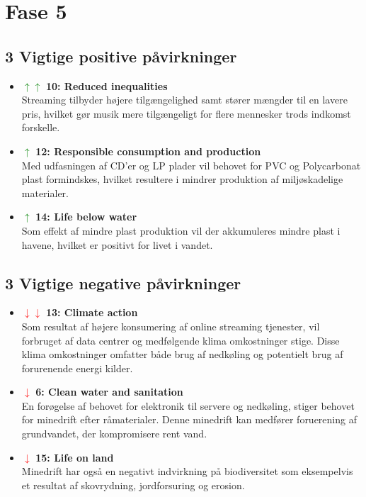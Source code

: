 \section*{Fase 5}

\subsection*{3 Vigtige positive påvirkninger}
\begin{itemize}
    \item \textcolor{green}{$\uparrow \uparrow$} \textbf{10: Reduced inequalities}\\
    Streaming tilbyder højere tilgængelighed samt stører mængder til en lavere pris, hvilket gør musik mere tilgængeligt for flere mennesker trods indkomst forskelle.

    \item \textcolor{green}{$\uparrow $} \textbf{12: Responsible consumption and production}\\
    Med udfasningen af CD'er og LP plader vil behovet for PVC og Polycarbonat plast formindskes, hvilket resultere i mindrer produktion af miljøskadelige materialer.
    
    \item \textcolor{green}{$\uparrow $} \textbf{14: Life below water}\\
    Som effekt af mindre plast produktion vil der akkumuleres mindre plast i havene, hvilket er positivt for livet i vandet.

\end{itemize}

\subsection*{3 Vigtige negative påvirkninger}
\begin{itemize}
    \item \textcolor{red}{$\downarrow \downarrow $} \textbf{13: Climate action}\\
    Som resultat af højere konsumering af online streaming tjenester, vil forbruget af data centrer og medfølgende klima omkostninger stige.
    Disse klima omkostninger omfatter både brug af nedkøling og potentielt brug af forurenende energi kilder.

    \item \textcolor{red}{$\downarrow $} \textbf{6: Clean water and sanitation}\\
    En forøgelse af behovet for elektronik til servere og nedkøling, stiger behovet for minedrift efter råmaterialer. Denne minedrift kan medfører foruerening af grundvandet, der kompromisere rent vand.

    \item \textcolor{red}{$\downarrow $} \textbf{15: Life on land}\\
    Minedrift har også en negativt indvirkning på biodiversitet som eksempelvis et resultat af skovrydning, jordforsuring og erosion.
\end{itemize}

